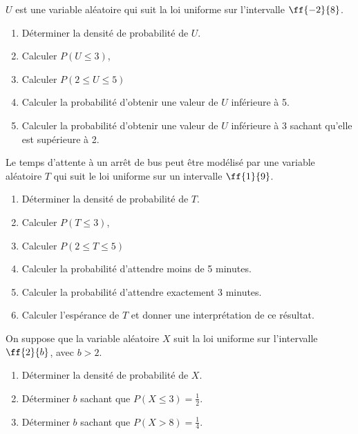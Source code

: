 \def\level{BTS}  %
\def\course{CIEL 2}
\def\chaptername{Lois continues} %
\def\docpart{Loi uniforme~--~TP1} %
\def\docname{C226}        %

\pagestyle{cours_FP}
\makeheaderBTS{} %

\begin{exercice_cours}[\quad]{}

$U$ est une variable aléatoire qui suit la loi uniforme sur l'intervalle $\ff{-2}{8}$.
	\begin{enumerate}
		\item Déterminer la densité de probabilité de $U$.
		\item Calculer $P(U\leqslant 3)$, 
		\item Calculer $P(2\leqslant U\leqslant 5)$ 
		\item Calculer la probabilité d'obtenir une valeur de $U$ inférieure à 5.
		\item Calculer la probabilité d'obtenir une valeur de $U$ inférieure à 3 sachant qu'elle est supérieure à 2.
	\end{enumerate}
\end{exercice_cours}

\begin{exercice_cours}[\quad]{}

	Le temps d'attente à un arrêt de bus peut être modélisé par une variable aléatoire $T$ qui suit le loi uniforme sur un intervalle $\ff{1}{9}$.

	\begin{enumerate}
		\item Déterminer la densité de probabilité de $T$.
		\item Calculer $P(T\leqslant 3)$, 
		\item Calculer $P(2\leqslant T\leqslant 5)$ 
		\item Calculer la probabilité d'attendre moins de 5 minutes.
		\item Calculer la probabilité d'attendre exactement 3 minutes.
		\item Calculer l'espérance de $T$ et donner une interprétation de ce résultat.
	\end{enumerate}


\end{exercice_cours}


\begin{exercice_cours}[\quad]{}

On suppose que la variable aléatoire $X$ suit la loi uniforme sur l'intervalle $\ff{2}{b}$, avec $b>2$.

\begin{enumerate}
	\item Déterminer la densité de probabilité de $X$.
	\item Déterminer $b$ sachant que $P(X\leqslant 3)=\frac{1}{2}$.
	\item Déterminer $b$ sachant que $P(X>8)=\frac{1}{4}$.
\end{enumerate}
\end{exercice_cours}

